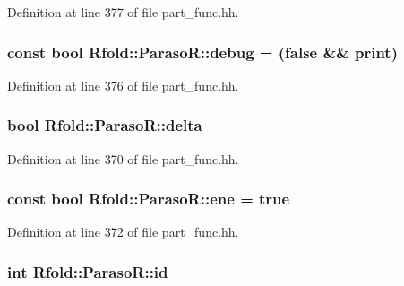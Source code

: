 Definition at line 377 of file part\+\_\+func.\+hh.

\hypertarget{class_rfold_1_1_paraso_r_a2858329db34fcaaa334abbfcea96c01d}{
\subsubsection[{debug}]{\setlength{\rightskip}{0pt plus 5cm}const bool Rfold\+::\+Paraso\+R\+::debug = (false \&\& {\bf print})\hspace{0.3cm}{\ttfamily [static]}}}\label{class_rfold_1_1_paraso_r_a2858329db34fcaaa334abbfcea96c01d}


Definition at line 376 of file part\+\_\+func.\+hh.

\hypertarget{class_rfold_1_1_paraso_r_ac0a808250ee05c1f56b5be32d867f11e}{
\subsubsection[{delta}]{\setlength{\rightskip}{0pt plus 5cm}bool Rfold\+::\+Paraso\+R\+::delta}}\label{class_rfold_1_1_paraso_r_ac0a808250ee05c1f56b5be32d867f11e}


Definition at line 370 of file part\+\_\+func.\+hh.

\hypertarget{class_rfold_1_1_paraso_r_a6e98b41eab558c42df86f5ff7469e7cc}{
\subsubsection[{ene}]{\setlength{\rightskip}{0pt plus 5cm}const bool Rfold\+::\+Paraso\+R\+::ene = true\hspace{0.3cm}{\ttfamily [static]}}}\label{class_rfold_1_1_paraso_r_a6e98b41eab558c42df86f5ff7469e7cc}


Definition at line 372 of file part\+\_\+func.\+hh.

\hypertarget{class_rfold_1_1_paraso_r_a707ccdcc12115fbe06a923fb21e58c06}{
\subsubsection[{id}]{\setlength{\rightskip}{0pt plus 5cm}int Rfold\+::\+Paraso\+R\+::id}}\label{class_rfold_1_1_paraso_r_a707ccdcc12115fbe06a923fb21e58c06}


